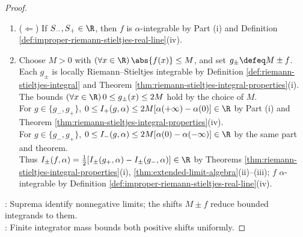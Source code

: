 \begin{theorem}
\begin{proof}
\begin{enumerate}[label=(\roman*)]
\item[$(iii)$] ($\Leftarrow$) If $S_-,S_+\in\R$, then $f$ is $\alpha$-integrable by Part (i) and Definition \ref{def:improper-riemann-stieltjes-real-line}(iv).
\item[$(iv)$] Choose $M>0$ with $(\forall x\in\R)\,\abs{f(x)}\leq M$, and set $g_\pm\defeq M\pm f$.\\
Each $g_\pm$ is locally Riemann--Stieltjes integrable by Definition \ref{def:riemann-stieltjes-integral} and Theorem \ref{thm:riemann-stieltjes-integral-properties}(i).\\
The bounds $(\forall x\in\R)\,0\leq g_\pm(x)\leq2M$ hold by the choice of $M$.\\
For $g\in\{g_-,g_+\}$, $0\leq I_+(g,\alpha)\leq2M[\alpha(+\infty)-\alpha(0)]\in\R$ by Part (i) and Theorem \ref{thm:riemann-stieltjes-integral-properties}(iv).\\
For $g\in\{g_-,g_+\}$, $0\leq I_-(g,\alpha)\leq2M[\alpha(0)-\alpha(-\infty)]\in\R$ by the same part and theorem.\\
Thus $I_\pm(f,\alpha)=\frac{1}{2}[I_\pm(g_+,\alpha)-I_\pm(g_-,\alpha)]\in\R$ by Theorems \ref{thm:riemann-stieltjes-integral-properties}(i), \ref{thm:extended-limit-algebra}(ii)--(iii); $f$ $\alpha$-integrable by Definition \ref{def:improper-riemann-stieltjes-real-line}(iv).
\end{enumerate}
: Suprema identify nonnegative limits; the shifts $M\pm f$ reduce bounded integrands to them.\\
: Finite integrator mass bounds both positive shifts uniformly.
\end{proof}
\end{theorem}
